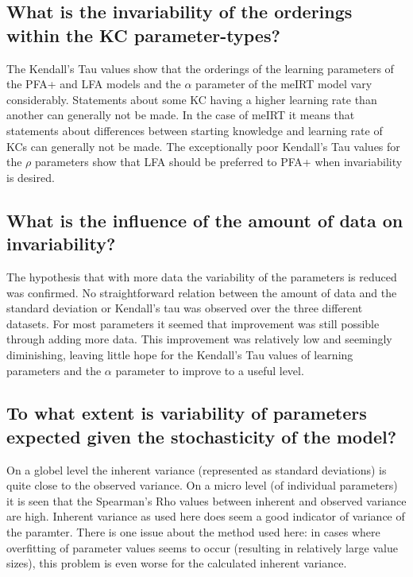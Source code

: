 \documentclass{scrartcl}
\begin{document}
\subsection{What is the invariability of the orderings within the KC parameter-types?}
The Kendall's Tau values show that the orderings of the learning parameters of the PFA+ and LFA models and the $\alpha$ parameter of the meIRT model vary considerably. Statements about some KC having a higher learning rate than another can generally not be made. In the case of meIRT it means that statements about differences between starting knowledge and learning rate of KCs can generally not be made. The exceptionally poor Kendall's Tau values for the $\rho$ parameters show that LFA should be preferred to PFA+ when invariability is desired.

\subsection{What is the influence of the amount of data on invariability?}
The hypothesis that with more data the variability of the parameters is reduced was confirmed. No straightforward relation between the amount of data and the standard deviation or Kendall's tau was observed over the three different datasets. For most parameters it seemed that improvement was still possible through adding more data. This improvement was relatively low and seemingly diminishing, leaving little hope for the Kendall's Tau values of learning parameters and the $\alpha$ parameter to improve to a useful level.

\subsection{To what extent is variability of parameters expected given the stochasticity of the model?}
On a globel level the inherent variance (represented as standard deviations) is quite close to the observed variance. On a micro level (of individual parameters) it is seen that the Spearman's Rho values between inherent and observed variance are high. Inherent variance as used here does seem a good indicator of variance of the paramter. There is one issue about the method used here: in cases where overfitting of parameter values seems to occur (resulting in relatively large value sizes), this problem is even worse for the calculated inherent variance.  
\end{document}
